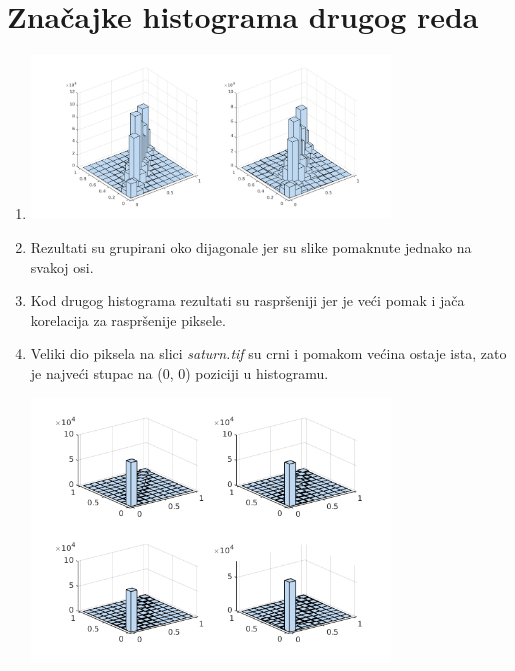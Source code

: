 \documentclass[12pt, a4]{report}
\begin{document}
\section{Značajke histograma drugog reda}
\begin{enumerate}
    \item
        \begin{minipage}{\linewidth}
            \centering
            \includegraphics[width=0.75\textwidth]{hist2}
        \end{minipage}
    \item
        Rezultati su grupirani oko dijagonale jer su slike pomaknute jednako na svakoj osi.
    \item
        Kod drugog histograma rezultati su raspršeniji jer je veći pomak i jača korelacija za raspršenije piksele.
    \item
        Veliki dio piksela na slici {\it saturn.tif} su crni i pomakom većina ostaje ista, zato je najveći stupac na (0, 0) poziciji u histogramu.


        \begin{minipage}{\linewidth}
            \centering
            \includegraphics[width=0.75\textwidth]{saturnhist}
        \end{minipage}
\end{enumerate}
\end{document}
